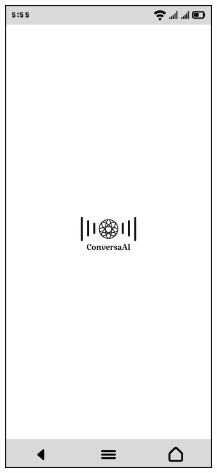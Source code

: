 \documentclass[12pt]{article}
\begin{document}
\begin{figure}[h!]
    \centering
    \begin{subfigure}[b]{0.32\textwidth}
        \centering
        \includegraphics[width=\textwidth]{openning_screen.png}

\end{subfigure}
\end{figure}
\end{document}

